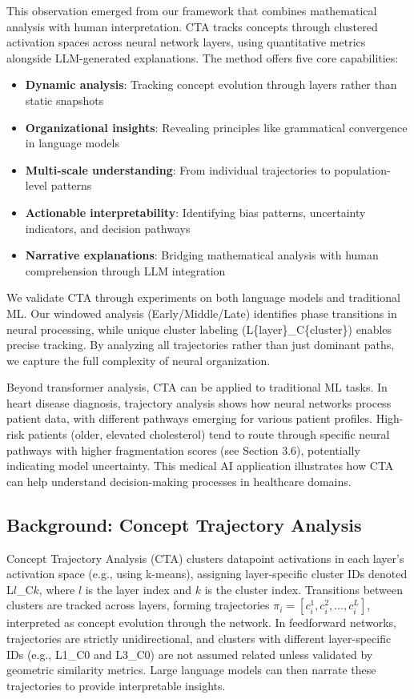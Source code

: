 This observation emerged from our framework that combines mathematical analysis with human interpretation. CTA tracks concepts through clustered activation spaces across neural network layers, using quantitative metrics alongside LLM-generated explanations. The method offers five core capabilities:

\begin{itemize}
    \item \textbf{Dynamic analysis}: Tracking concept evolution through layers rather than static snapshots
    \item \textbf{Organizational insights}: Revealing principles like grammatical convergence in language models
    \item \textbf{Multi-scale understanding}: From individual trajectories to population-level patterns
    \item \textbf{Actionable interpretability}: Identifying bias patterns, uncertainty indicators, and decision pathways
    \item \textbf{Narrative explanations}: Bridging mathematical analysis with human comprehension through LLM integration
\end{itemize}

We validate CTA through experiments on both language models and traditional ML. Our windowed analysis (Early/Middle/Late) identifies phase transitions in neural processing, while unique cluster labeling (L\{layer\}\_C\{cluster\}) enables precise tracking. By analyzing all trajectories rather than just dominant paths, we capture the full complexity of neural organization.

Beyond transformer analysis, CTA can be applied to traditional ML tasks. In heart disease diagnosis, trajectory analysis shows how neural networks process patient data, with different pathways emerging for various patient profiles. High-risk patients (older, elevated cholesterol) tend to route through specific neural pathways with higher fragmentation scores (see Section 3.6), potentially indicating model uncertainty. This medical AI application illustrates how CTA can help understand decision-making processes in healthcare domains.

\subsection{Background: Concept Trajectory Analysis}

Concept Trajectory Analysis (CTA) clusters datapoint activations in each layer's activation space (e.g., using k-means), assigning layer-specific cluster IDs denoted L$l$\_C$k$, where $l$ is the layer index and $k$ is the cluster index. Transitions between clusters are tracked across layers, forming trajectories $\pi_i = [c_i^1, c_i^2, \dots, c_i^L]$, interpreted as concept evolution through the network. In feedforward networks, trajectories are strictly unidirectional, and clusters with different layer-specific IDs (e.g., L1\_C0 and L3\_C0) are not assumed related unless validated by geometric similarity metrics. Large language models can then narrate these trajectories to provide interpretable insights.

